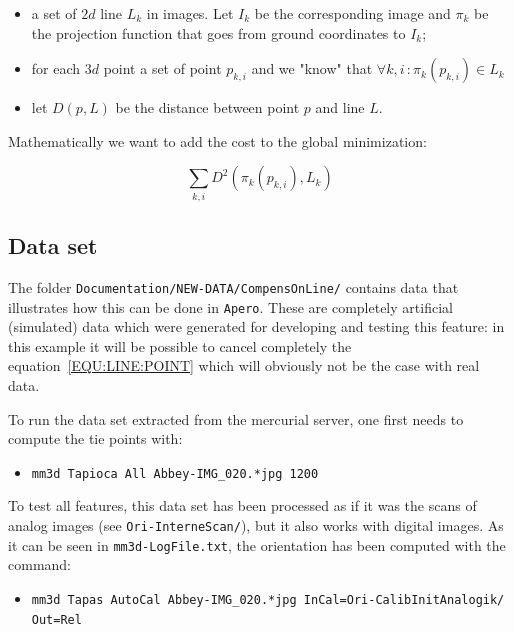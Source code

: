 \begin{itemize}
    \item a set of $2d$ line $L_k$ in images. Let $I_k$ be the corresponding image and $\pi_k$ be the projection
         function that goes from ground coordinates to $I_k$;
    \item for each $3d$ point a set of point $p_{k,i}$ and we "know" that $\forall k,i \, : \pi_k (p_{k,i}) \in L_k $
    \item let $D(p,L)$ be the distance between point $p$ and line $L$.
\end{itemize}

Mathematically we want to add the cost to the global minimization:

\begin{equation}
    \sum_{k,i} D^2 ( \pi_k(p_{k,i}),L_k) \label{EQU:LINE:POINT}
\end{equation}



\subsection{Data set}

The folder {\tt Documentation/NEW-DATA/CompensOnLine/} contains  data that illustrates how this can be done in
{\tt Apero}. These are completely artificial (simulated) data which were generated for developing and testing this feature: in this example it will be possible to cancel completely the equation~\ref{EQU:LINE:POINT} which will obviously not
be the case with real data.

To run the data set extracted from the mercurial server, one first needs to compute the tie points with:

\begin{itemize}
   \item {\tt mm3d Tapioca All Abbey-IMG\_020.*jpg 1200}
\end{itemize}

To test all features, this data set has been processed as if it was the scans of analog images
(see {\tt Ori-InterneScan/}), but it also works with digital images. As it can be seen in {\tt mm3d-LogFile.txt},
the orientation has been computed with the command:

\begin{itemize}
   \item {\tt mm3d Tapas AutoCal Abbey-IMG\_020.*jpg InCal=Ori-CalibInitAnalogik/ Out=Rel}

\end{itemize}

